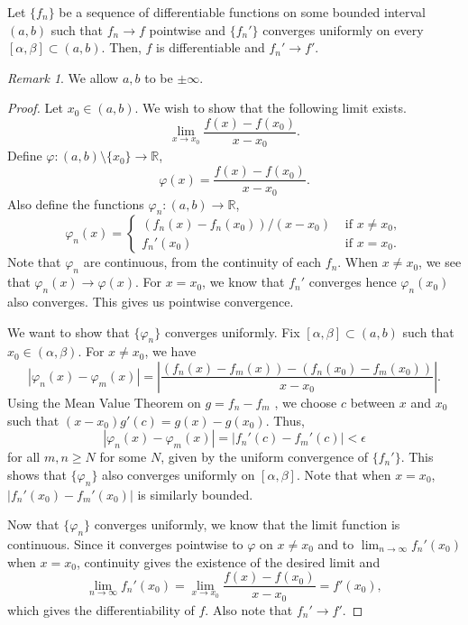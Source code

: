 \documentclass[11pt]{article}
\def\R{\mathbb{R}}
\theoremstyle{definition}
\theoremstyle{remark}
\newtheorem*{remark}{Remark}
\numberwithin{equation}{module}
\begin{document}
    \begin{theorem}
        Let $\{f_n\}$ be a sequence of differentiable functions on some bounded
        interval $(a, b)$ such that $f_n \to f$ pointwise and $\{f_n'\}$ converges
        uniformly on every $[\alpha, \beta] \subset (a, b)$.
        Then, $f$ is differentiable and $f_n' \to f'$.
        \begin{remark}
            We allow $a, b$ to be $\pm \infty$.
        \end{remark}
    \end{theorem}
    \begin{proof}
        Let $x_0 \in (a, b)$. We wish to show that the following limit exists. \[
            \lim_{x \to x_0} \frac{f(x) - f(x_0)}{x - x_0}.
        \] Define $\varphi\colon (a, b) \setminus \{x_0\} \to \R$, \[
            \varphi(x) = \frac{f(x) - f(x_0)}{x - x_0}.
        \] Also define the functions $\varphi_n\colon (a, b) \to \R$, \[
            \varphi_n(x) = \begin{cases}
                (f_n(x) - f_n(x_0))/(x - x_0) &\text{ if } x \neq x_0, \\
                f_n'(x_0) &\text{ if } x = x_0.
            \end{cases}
        \] Note that $\varphi_n$ are continuous, from the continuity of each $f_n$.
        When $x \neq x_0$, we see that $\varphi_n(x) \to \varphi(x)$. 
        For $x = x_0$, we know that $f_n'$ converges hence $\varphi_n(x_0)$ also 
        converges. This gives us pointwise convergence.

        We want to show that $\{\varphi_n\}$ converges uniformly. Fix $[\alpha,
        \beta] \subset (a, b)$ such that $x_0 \in (\alpha, \beta)$. For $x \neq
        x_0$, we have \[
            |\varphi_n(x) - \varphi_m(x)| = \left| \frac{(f_n(x) - f_m(x)) -
            (f_n(x_0) - f_m(x_0))}{x - x_0} \right|.
        \] Using the Mean Value Theorem on $g = f_n - f_m$ , we choose $c$ between $x$
        and $x_0$ such that $(x - x_0)g'(c) = g(x) - g(x_0)$. Thus, \[
            |\varphi_n(x) - \varphi_m(x)| = |f_n'(c) - f_m'(c)| < \epsilon
        \] for all $m, n \geq N$ for some $N$, given by the uniform convergence of
        $\{f_n'\}$. This shows that $\{\varphi_n\}$ also converges uniformly on
        $[\alpha, \beta]$. Note that when $x = x_0$, $|f_n'(x_0) - f_m'(x_0)|$ is
        similarly bounded.

        Now that $\{\varphi_n\}$ converges uniformly, we know that the limit
        function is continuous. Since it converges pointwise to $\varphi$ on $x \neq
        x_0$ and to $\lim_{n \to \infty} f_n'(x_0)$ when $x = x_0$, continuity gives
        the existence of the desired limit and \[
            \lim_{n \to \infty} f_n'(x_0) = \lim_{x \to x_0} \frac{f(x) - f(x_0)}{x
            - x_0} = f'(x_0),
        \] which gives the differentiability of $f$. Also note that $f_n' \to f'$.
    \end{proof}
    
\end{document}
